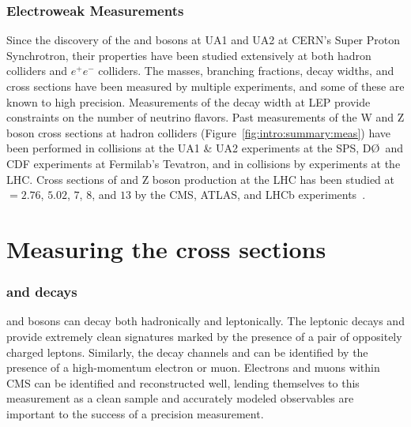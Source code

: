 \subsubsection{Electroweak Measurements}
Since the discovery of the \W and \Z bosons at UA1 and UA2 at CERN's Super Proton Synchrotron, their properties have been studied extensively at both hadron colliders and $e^+e^-$ colliders. The masses, branching fractions,  decay widths, and cross sections have been measured by multiple experiments, and some of these are known to high precision. Measurements of the \Z decay width at LEP provide constraints on the number of neutrino flavors. 
Past measurements of the W and Z boson cross sections at hadron colliders (Figure~\ref{fig:intro:summary:meas}) have been performed in \ppbar collisions at the UA1 \& UA2 experiments at the SPS, D\O ~and CDF experiments at Fermilab's Tevatron, and in \pp collisions by experiments at the LHC. 
Cross sections of \Wpm and Z boson production at the LHC has been studied at \s $= 2.76$, $5.02$, $7$, $8$, and $13$ \TeV by the CMS, ATLAS, and LHCb experiments~\cite{Aad:2019bdc,Aaboud:2018nic,Aaboud:2016btc,CMS:2011aa,Aaij:2014wba,Aaij:2012mda,Aaij:2015gna,Aaij:2016qqz,Aaij:2016mgv,Aaij:2015zlq,Chatrchyan:2014mua,Aad:2016naf}. 



\section{Measuring the cross sections}
\subsubsection{\W and \Z decays}
\W and \Z bosons can decay both hadronically and leptonically. The leptonic decays \zee and \zmm provide extremely clean signatures marked by the presence of a pair of oppositely charged leptons. Similarly, the decay channels \wenu and \wmunu can be identified by the presence of a high-momentum electron or muon. Electrons and muons within CMS can be identified and reconstructed well, lending themselves to this measurement as a clean sample and accurately modeled observables are important to the success of a precision measurement.
